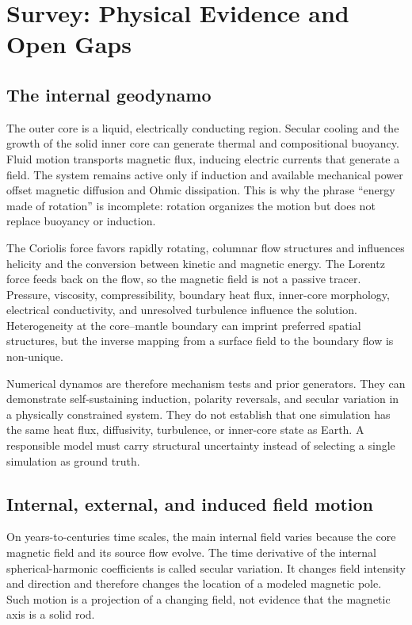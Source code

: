 \documentclass[conference]{IEEEtran}
\begin{document}
\section{Survey: Physical Evidence and Open Gaps}
\subsection{The internal geodynamo}
The outer core is a liquid, electrically conducting region. Secular cooling and the growth of the solid inner core can generate thermal and compositional buoyancy. Fluid motion transports magnetic flux, inducing electric currents that generate a field. The system remains active only if induction and available mechanical power offset magnetic diffusion and Ohmic dissipation. This is why the phrase “energy made of rotation” is incomplete: rotation organizes the motion but does not replace buoyancy or induction.

The Coriolis force favors rapidly rotating, columnar flow structures and influences helicity and the conversion between kinetic and magnetic energy. The Lorentz force feeds back on the flow, so the magnetic field is not a passive tracer. Pressure, viscosity, compressibility, boundary heat flux, inner-core morphology, electrical conductivity, and unresolved turbulence influence the solution. Heterogeneity at the core--mantle boundary can imprint preferred spatial structures, but the inverse mapping from a surface field to the boundary flow is non-unique.

Numerical dynamos are therefore mechanism tests and prior generators. They can demonstrate self-sustaining induction, polarity reversals, and secular variation in a physically constrained system. They do not establish that one simulation has the same heat flux, diffusivity, turbulence, or inner-core state as Earth. A responsible model must carry structural uncertainty instead of selecting a single simulation as ground truth.

\subsection{Internal, external, and induced field motion}
On years-to-centuries time scales, the main internal field varies because the core magnetic field and its source flow evolve. The time derivative of the internal spherical-harmonic coefficients is called secular variation. It changes field intensity and direction and therefore changes the location of a modeled magnetic pole. Such motion is a projection of a changing field, not evidence that the magnetic axis is a solid rod.
\end{document}
